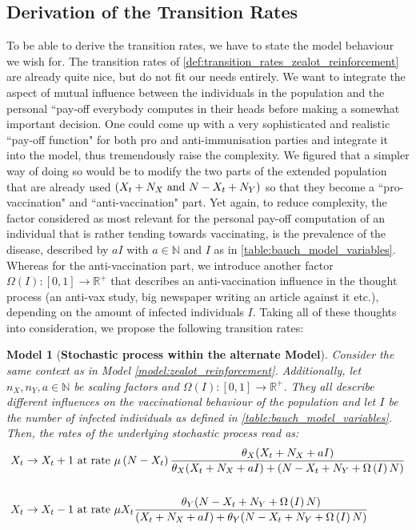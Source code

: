 \documentclass[12pt,a4paper,twoside]{article}
\newtheorem{model}{Model}[section]
\begin{document}
\subsection{Derivation of the Transition Rates}
To be able to derive the transition rates, we have to state the model behaviour we wish for. The transition rates of \eqref{def:transition_rates_zealot_reinforcement} are already quite nice, but do not fit our needs entirely. We want to integrate the aspect of mutual influence between the individuals in the population and the personal ``pay-off everybody computes in their heads before making a somewhat important decision. One could come up with a very sophisticated and realistic ``pay-off function" for both pro and anti-immunisation parties and integrate it into the model, thus tremendously raise the complexity. We figured that a simpler way of doing so would be to modify the two parts of the extended population that are already used $\left(X_t + N_X\textnormal{ and }N- X_t + N_Y\right)$ so that they become a ``pro-vaccination" and ``anti-vaccination" part. Yet again, to reduce complexity, the factor considered as most relevant for the personal pay-off computation of an individual that is rather tending towards vaccinating, is the prevalence of the disease, described by $aI$ with $a \in \mathbb{N}$ and $I$ as in \eqref{table:bauch_model_variables}. Whereas for the anti-vaccination part, we introduce another factor $\Omega\left(I\right): \left[0,1\right]\rightarrow \mathbb{R^+}$ that describes an anti-vaccination influence in the thought process (an anti-vax study, big newspaper writing an article against it etc.), depending on the amount of infected individuals $I$.
Taking all of these thoughts into consideration, we propose the following transition rates:
\begin{model}[\textbf{Stochastic process within the alternate Model}]
	Consider the same context as in Model \ref{model:zealot_reinforcement}. Additionally, let $n_X, n_Y, a \in \mathbb{N}$ be scaling factors and $\Omega\left(I\right): \left[0,1\right] \rightarrow \mathbb{R^+}$. They all describe different influences on the vaccinational behaviour of the population and let $I$ be the number of infected individuals as defined in \eqref{table:bauch_model_variables}. Then, the rates of the underlying stochastic process read as:
\begin{align}\label{def:transition_rates_my_model}
\begin{split}
X_t \rightarrow X_t + 1 & \textnormal{ at rate } \mu\left(N-X_t\right)\frac{\theta_X (X_t + N_X + aI)}{\theta_X (X_t + N_X + aI) + (N-X_t + N_Y + \Omega\left(I\right) N)} \\
&\\
X_t \rightarrow X_t - 1 & \textnormal{ at rate } \mu X_t\frac{\theta_Y(N-X_t+N_Y + \Omega\left(I\right) N)}{(X_t + N_X+aI) + \theta_Y(N-X_t+N_Y + \Omega\left(I\right) N)}
\end{split}
\end{align}
\end{model}
\end{document}
